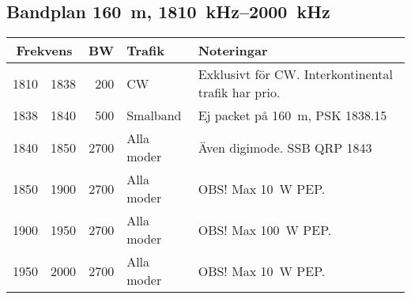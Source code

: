 \subsection{Bandplan \qty{160}{\metre}, \SIrange{1810}{2000}{\kilo\hertz}}
\begin{tabular}{rrrll}
\multicolumn{2}{c}{\textbf{Frekvens}} & \textbf{BW} & \textbf{Trafik} & \textbf{Noteringar} \\ \hline

1810 & 1838 & 200  & CW         & Exklusivt för CW. Interkontinental trafik har prio. \\ \hline
1838 & 1840 & 500  & Smalband   & Ej packet på \qty{160}{\metre}, PSK \num{1838,15}         \\ \hline
1840 & 1850 & 2700 & Alla moder & Även digimode. SSB QRP \num{1843}                  \\ \hline
1850 & 1900 & 2700 & Alla moder & OBS! Max \qty{10}{\watt} PEP.                       \\ \hline
1900 & 1950 & 2700 & Alla moder & OBS! Max \qty{100}{\watt} PEP.                      \\ \hline
1950 & 2000 & 2700 & Alla moder & OBS! Max \qty{10}{\watt} PEP.                       \\
\end{tabular}

